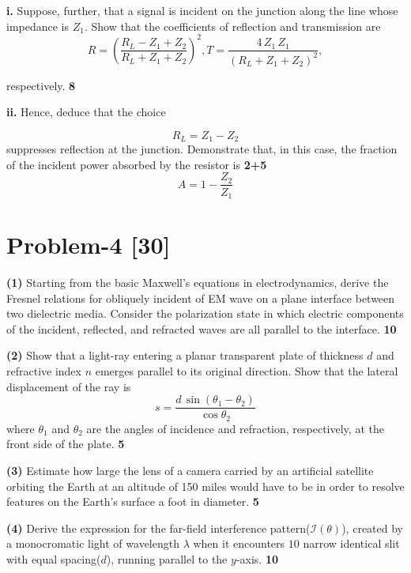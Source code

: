 \documentclass[12pt, a4paper]{article}
\begin{document}
\textbf{i.} Suppose, further, that a signal is incident on the junction along the line whose impedance is $Z_1$.
Show that the coefficients of reflection and transmission are
\begin{equation*}
    R = (\frac{R_L-Z_1+Z_2}{R_L+Z_1+Z_2})^2,
    T = \frac{4\,Z_1\,Z_1}{(R_L+Z_1+Z_2)^2},
\end{equation*}
	   
respectively. \hfill\textbf{8}

\textbf{ii.} Hence, deduce that the choice

\begin{equation*}
    R_L= Z_1-Z_2
\end{equation*}
suppresses reflection at the junction. Demonstrate that, in this case, the fraction of the incident 
power absorbed by the resistor is \hfill\textbf{2+5}
\begin{equation*}
    A=1-\frac{Z_2}{Z_1}
\end{equation*}

\section*{Problem-4 \hfill \textbf{[30]}}

\noindent
\textbf{(1)} Starting from the basic Maxwell's equations in electrodynamics, derive the Fresnel 
relations for obliquely incident of EM wave on a plane interface between two dielectric media.
Consider the polarization state in which electric components of the incident, reflected, and 
refracted waves are all parallel to the interface. \hfill\textbf{10}

\noindent
\textbf{(2)} Show that a light-ray entering a planar transparent plate of thickness $d$ and 
refractive index $n$ emerges parallel to its original direction. Show that the lateral displacement 
of the ray is
\begin{equation*}
    s = \frac{d\,\sin(\theta_1-\theta_2)}{\cos\theta_2}
\end{equation*}
where $\theta_1$ and $\theta_2$ are the angles of incidence and refraction, respectively, at the 
front side of the plate. \hfill\textbf{5}

\noindent
\textbf{(3)} Estimate how large the lens of a camera carried by an artificial satellite orbiting the 
Earth at an altitude of 150 miles would have to be in order to resolve features on the Earth's 
surface a foot in diameter. \hfill\textbf{5}
 
\noindent
\textbf{(4)} Derive the expression for the far-field interference pattern($\mathcal{I}(\theta)$), 
created by a monocromatic light of wavelength $\lambda$ when it encounters $10$ narrow identical 
slit with equal spacing($d$), running parallel to the $y$-axis. \hfill\textbf{10}
\end{document}
